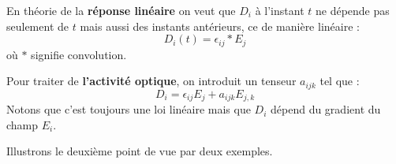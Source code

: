 \documentclass[12pt]{book}
\begin{document}
\begin{exmp}
En th\'eorie de la {\bf r\'eponse lin\'eaire} on veut que $D_i$ \`a
l'instant $t$ ne d\'epende pas seulement de $t$ mais aussi des instants
ant\'erieurs, ce de mani\`ere lin\'eaire :
\begin{equation}
D_i(t)=\epsilon_{ij}*E_j
\end{equation}
o\`u $*$ signifie convolution.
\end{exmp}

\begin{exmp}
Pour traiter de {\bf l'activit\'e optique}\cite{ph:elect:LandauEle}, on introduit un
tenseur $a_{ijk}$ tel que :
\begin{equation}
D_i=\epsilon_{ij}E_j+a_{ijk}E_{j,k}
\end{equation}
Notons que c'est toujours une loi lin\'eaire mais que $D_i$ d\'epend du
gradient du champ $E_i$.
\end{exmp}
Illustrons le deuxi\`eme point de vue par deux exemples.
\end{document}
